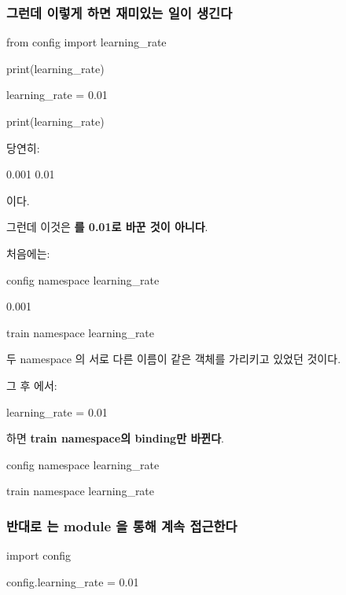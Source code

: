 \subsubsection{그런데 이렇게 하면 재미있는 일이 생긴다}

\begin{dhkcode}
from config import learning_rate

print(learning_rate)

learning_rate = 0.01

print(learning_rate)
\end{dhkcode}

당연히:

\begin{dhkzsh}
0.001
0.01
\end{dhkzsh}

이다.

그런데 이것은 \textbf{를 0.01로 바꾼 것이 아니다}.

처음에는:

\begin{dhksmry}[centered]
config namespace
learning_rate

\da

0.001

\ua

train namespace
learning_rate
\end{dhksmry}

두 namespace 의 서로 다른 이름이 같은 객체를 가리키고 있었던 것이다.

그 후 에서:

\begin{dhkcode}
learning_rate = 0.01
\end{dhkcode}

하면 \textbf{train namespace의 binding만 바뀐다}.

\begin{dhksmry}
    config namespace
    learning_rate 

    train namespace
    learning_rate 
\end{dhksmry}

\subsubsection{반대로 는 module 을 통해 계속 접근한다}

\begin{dhkcode}
import config

config.learning_rate = 0.01
\end{dhkcode}

